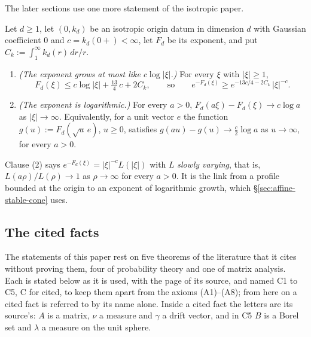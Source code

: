 The later sections use one more statement of the isotropic paper.

\begin{lemma}\label{lem:isotropic-exponent-log}
Let $d \ge 1$, let $(0,k_d)$ be an isotropic origin datum in dimension $d$ with Gaussian
coefficient $0$ and $c = k_d(0{+}) < \infty$, let $F_d$ be its exponent, and put
$C_k := \int_1^\infty k_d(r)\,dr/r$.
\begin{enumerate}
\item \emph{(The exponent grows at most like $c\log|\xi|$.)} For every $\xi$ with $|\xi| \ge 1$,
\[
  F_d(\xi) \le c\log|\xi| + \tfrac{13}{4}\,c + 2C_k ,
  \qquad\text{so}\qquad
  e^{-F_d(\xi)} \ge e^{-13c/4 - 2C_k}\,|\xi|^{-c} .
\]
\item \emph{(The exponent is logarithmic.)} For every $a > 0$,
$F_d(a\xi) - F_d(\xi) \to c\log a$ as $|\xi| \to \infty$. Equivalently, for a unit vector $e$ the
function $g(u) := F_d(\sqrt u\,e)$, $u \ge 0$, satisfies $g(au) - g(u) \to \tfrac c2\log a$ as
$u \to \infty$, for every $a > 0$.
\end{enumerate}
\end{lemma}

Clause (2) says $e^{-F_d(\xi)} = |\xi|^{-c}L(|\xi|)$ with $L$ \emph{slowly varying}, that is,
$L(a\rho)/L(\rho) \to 1$ as $\rho \to \infty$ for every $a > 0$. It is the link from a profile
bounded at the origin to an exponent of logarithmic growth, which \S\ref{sec:affine-stable-cone}
uses.

\subsection{The cited facts}\label{sec:cited-facts}

The statements of this paper rest on five theorems of the literature that it cites without proving
them, four of probability theory and one of matrix analysis. Each is stated below as it is used,
with the page of its source, and named C1 to C5, C for cited, to keep them apart from the axioms
(A1)--(A8); from here on a cited fact is referred to by its name alone. Inside a cited fact the
letters are its source's: $A$ is a matrix, $\nu$ a \Levy{} measure and $\gamma$ a drift vector, and in
C5 $B$ is a Borel set and $\lambda$ a measure on the unit sphere.

